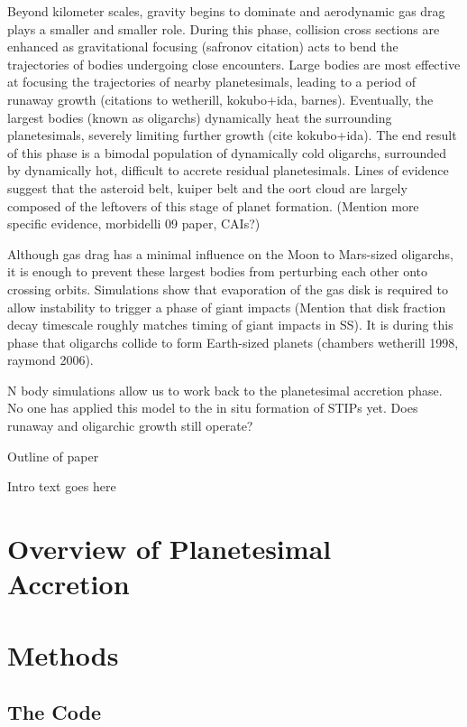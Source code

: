 \documentclass[onecolumn]{aastex63}
\begin{document}
Beyond kilometer scales, gravity begins to dominate and aerodynamic gas drag plays a smaller and smaller role. During this phase, collision cross sections are enhanced as gravitational focusing (safronov citation) acts to bend the trajectories of bodies undergoing close encounters. Large bodies are most effective at focusing the trajectories of nearby planetesimals, leading to a period of runaway growth (citations to wetherill, kokubo+ida, barnes). Eventually, the largest bodies (known as oligarchs) dynamically heat the surrounding planetesimals, severely limiting further growth (cite kokubo+ida). The end result of this phase is a bimodal population of dynamically cold oligarchs, surrounded by dynamically hot, difficult to accrete residual planetesimals. Lines of evidence suggest that the asteroid belt, kuiper belt and the oort cloud are largely composed of the leftovers of this stage of planet formation. (Mention more specific evidence, morbidelli 09 paper, CAIs?)

Although gas drag has a minimal influence on the Moon to Mars-sized oligarchs, it is enough to prevent these largest bodies from perturbing each other onto crossing orbits. Simulations show that evaporation of the gas disk is required to allow instability to trigger a phase of giant impacts (Mention that disk fraction decay timescale roughly matches timing of giant impacts in SS). It is during this phase that oligarchs collide to form Earth-sized planets (chambers wetherill 1998, raymond 2006).

N body simulations allow us to work back to the planetesimal accretion phase. No one has applied this model to the in situ formation of STIPs yet. Does runaway and oligarchic growth still operate?

Outline of paper

Intro text goes here \citep{Wallace2019}

\section{Overview of Planetesimal Accretion}

\section{Methods}

\subsection{The Code}
\end{document}
